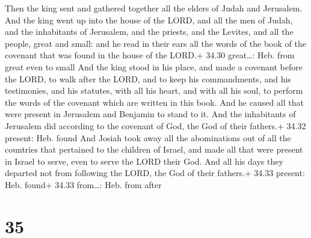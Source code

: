  Then the king sent and gathered together all the elders
of Judah and Jerusalem.  And the king went up into the
house of the LORD, and all the men of Judah, and the inhabitants of
Jerusalem, and the priests, and the Levites, and all the people, great
and small: and he read in their ears all the words of the book of the
covenant that was found in the house of the LORD.+ 34.30 great\ldots:
Heb. from great even to small  And the king stood in his
place, and made a covenant before the LORD, to walk after the LORD, and
to keep his commandments, and his testimonies, and his statutes, with
all his heart, and with all his soul, to perform the words of the
covenant which are written in this book.  And he caused all
that were present in Jerusalem and Benjamin to stand to it. And the
inhabitants of Jerusalem did according to the covenant of God, the God
of their fathers.+ 34.32 present: Heb. found  And Josiah
took away all the abominations out of all the countries that pertained
to the children of Israel, and made all that were present in Israel to
serve, even to serve the LORD their God. And all his days they departed
not from following the LORD, the God of their fathers.+ 34.33 present:
Heb. found+ 34.33 from\ldots: Heb. from after

\hypertarget{section-34}{%
\section{35}\label{section-34}}

